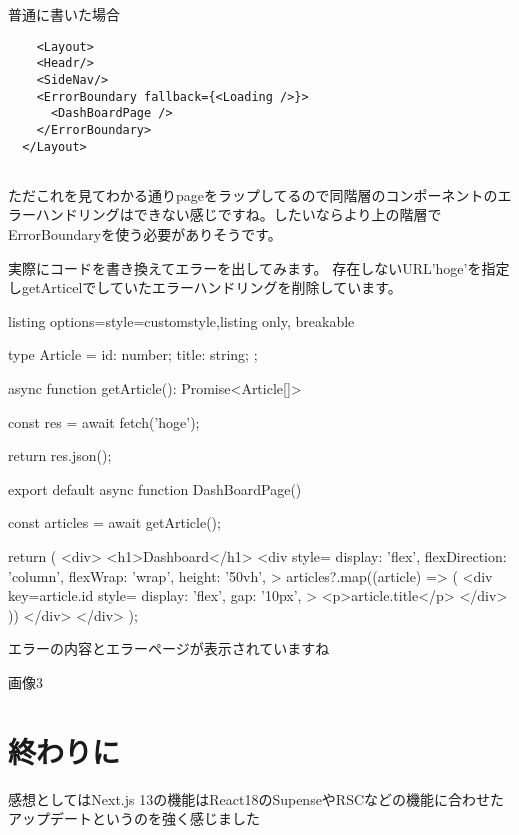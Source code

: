 普通に書いた場合



\begin{tcolorbox}[breakable]
  \begin{verbatim}
    <Layout>
    <Headr/>
    <SideNav/>
    <ErrorBoundary fallback={<Loading />}>
      <DashBoardPage />
    </ErrorBoundary>
  </Layout>
    
  \end{verbatim}
\end{tcolorbox}


ただこれを見てわかる通りpageをラップしてるので同階層のコンポーネントのエラーハンドリングはできない感じですね。したいならより上の階層でErrorBoundaryを使う必要がありそうです。

実際にコードを書き換えてエラーを出してみます。
存在しないURL'hoge'を指定しgetArticelでしていたエラーハンドリングを削除しています。


\begin{tcblisting}{listing options={style=customstyle},listing only, breakable}

  type Article = {
  id: number;
  title: string;
  };

  async function getArticle(): Promise<Article[]> {
      const res = await fetch('hoge');

      return res.json();
    }

  export default async function DashBoardPage() {
  const articles = await getArticle();

  return (
  <div>
  <h1>Dashboard</h1>
  <div
  style={{
      display: 'flex',
      flexDirection: 'column',
      flexWrap: 'wrap',
      height: '50vh',
    }}
  >
  {articles?.map((article) => (
  <div
  key={article.id}
  style={{
      display: 'flex',
      gap: '10px',
    }}
  >
    <p>{article.title}</p>
  </div>
  ))}
  </div>
  </div>
  );
  }

\end{tcblisting}


エラーの内容とエラーページが表示されていますね


画像3



\section{終わりに}
感想としてはNext.js 13の機能はReact18のSupenseやRSCなどの機能に合わせたアップデートというのを強く感じました